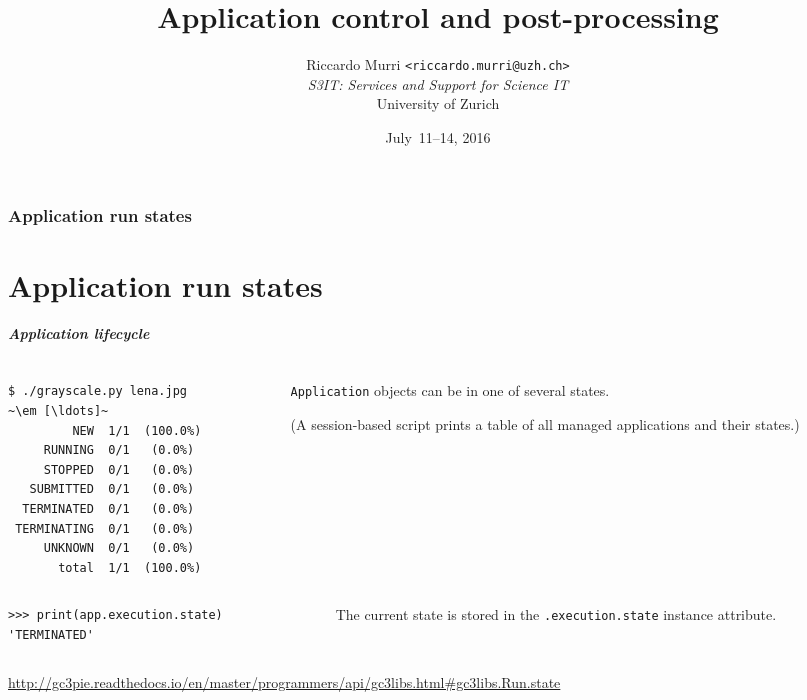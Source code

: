 \documentclass[english,serif,mathserif,xcolor=pdftex,dvipsnames,table]{beamer}
\title[Introduction]{%
  Application control and post-processing
}
\author[R. Murri, S3IT UZH]{%
  Riccardo Murri \texttt{<riccardo.murri@uzh.ch>}
  \\[1ex]
  \emph{S3IT: Services and Support for Science IT}
  \\[1ex]
  University of Zurich
}
\date{July~11--14, 2016}
\begin{document}
\maketitle


\section{Application run states}
\part{Application run states}

\begin{frame}[fragile]
\frametitle{Application lifecycle}

\begin{columns}[c]
  \begin{column}{0.5\textwidth}
\begin{lstlisting}[basicstyle=\footnotesize\ttfamily,keywordstyle=\normalfont]
$ ./grayscale.py lena.jpg
~\em [\ldots]~
         NEW  1/1  (100.0%)
     RUNNING  0/1   (0.0%)
     STOPPED  0/1   (0.0%)
   SUBMITTED  0/1   (0.0%)
  TERMINATED  0/1   (0.0%)
 TERMINATING  0/1   (0.0%)
     UNKNOWN  0/1   (0.0%)
       total  1/1  (100.0%)
\end{lstlisting}%
  \end{column}
  \begin{column}{0.5\textwidth}
    \raggedleft
    \texttt{Application} objects can be in one of several states.

    \+
    (A session-based script prints a table of all managed applications and their states.)
  \end{column}
\end{columns}

\+
\begin{columns}[c]
  \begin{column}{0.5\textwidth}
\begin{lstlisting}[basicstyle=\footnotesize\ttfamily]
>>> print(app.execution.state)
'TERMINATED'
\end{lstlisting}
  \end{column}
  \begin{column}{0.5\textwidth}
    \raggedleft
    The current state is stored in the \texttt{.execution.state} instance attribute.
  \end{column}
\end{columns}

\+
\begin{references}
  \tiny
  \url{http://gc3pie.readthedocs.io/en/master/programmers/api/gc3libs.html#gc3libs.Run.state}
\end{references}
\end{frame}
\end{document}
